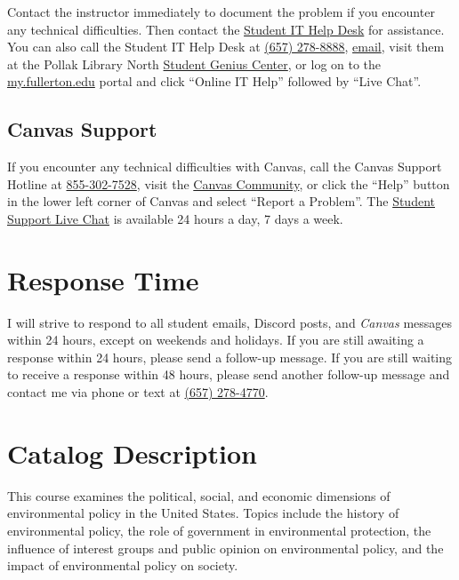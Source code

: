 \documentclass[12pt, letterpaper]{article}
\begin{document}
Contact the instructor immediately to document the problem if you encounter any technical difficulties. Then contact the \href{http://www.fullerton.edu/it/students/helpdesk/index.php}{Student IT Help Desk} for assistance. You can also call the Student IT Help Desk at \href{tel:+16572788888}{(657) 278-8888}, \href{mailto:StudentITHelpDesk@fullerton.edu}{email}, visit them at the Pollak Library North \href{http://www.fullerton.edu/it/students/sgc/index.php}{Student Genius Center}, or log on to the \href{http://my.fullerton.edu/}{my.fullerton.edu} portal and click ``Online IT Help'' followed by ``Live Chat''.

\subsection*{Canvas Support}

If you encounter any technical difficulties with Canvas, call the Canvas Support Hotline at \href{tel:+18553027528}{855-302-7528}, visit the \href{https://community.canvaslms.com/docs/DOC-10720-67952720329}{Canvas Community}, or click the ``Help'' button in the lower left corner of Canvas and select ``Report a Problem''. The \href{https://cases.canvaslms.com/liveagentchat?chattype=student&sfid=001A000000YzcwQIAR}{Student Support Live Chat} is available 24 hours a day, 7 days a week.

\section*{Response Time} I will strive to respond to all student emails, Discord posts, and \emph{Canvas} messages within 24 hours, except on weekends and holidays. If you are still awaiting a response within 24 hours, please send a follow-up message. If you are still waiting to receive a response within 48 hours, please send another follow-up message and contact me via phone or text at \href{tel:+16572784770}{(657) 278-4770}.

\section*{Catalog Description}

This course examines the political, social, and economic dimensions of environmental policy in the United States. Topics include the history of environmental policy, the role of government in environmental protection, the influence of interest groups and public opinion on environmental policy, and the impact of environmental policy on society.
\end{document}
